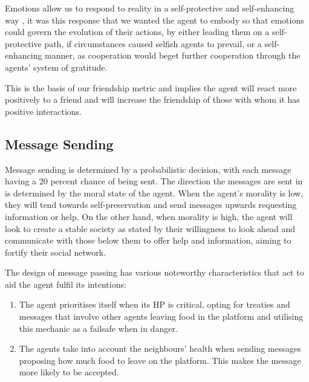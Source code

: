 Emotions allow us to respond to reality in a self-protective and self-enhancing way \cite{ekman_1992}, it was this response that we wanted the agent to embody so that emotions could govern the evolution of their actions, by either leading them on a self-protective path, if circumstances caused selfish agents to prevail, or a self-enhancing manner, as cooperation would beget further cooperation through the agents' system of gratitude.\par
This is the basis of our friendship metric and implies the agent will react more positively to a friend and will increase the friendship of those with whom it has positive interactions.

\subsection{Message Sending}
Message sending is determined by a probabilistic decision, with each message having a 20 percent chance of being sent. The direction the messages are sent in is determined by the moral state of the agent. When the agent's morality is low, they will tend towards self-preservation and send messages upwards requesting information or help. On the other hand, when morality is high, the agent will look to create a stable society as stated by their willingness to look ahead and communicate with those below them to offer help and information, aiming to fortify their social network.\par 
The design of message passing has various noteworthy characteristics that act to aid the agent fulfil its intentions:
\begin{enumerate}
    \item The agent prioritises itself when its HP is critical, opting for treaties and messages that involve other agents leaving food in the platform and utilising this mechanic as a failsafe when in danger.
    \item The agents take into account the neighbours' health when sending messages proposing how much food to leave on the platform. This makes the message more likely to be accepted. 
\end{enumerate}

